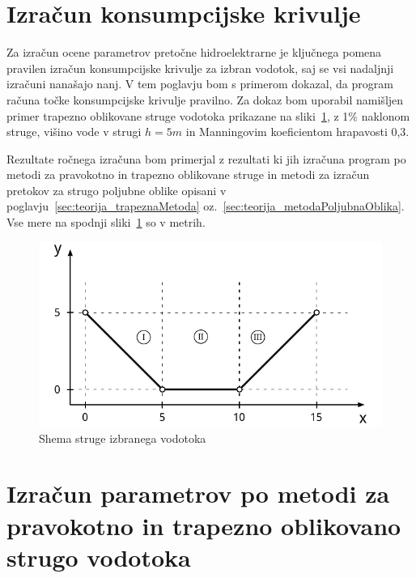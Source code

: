 \newpage

\section{Izračun konsumpcijske krivulje}\label{sec:izracun}

Za izračun ocene parametrov pretočne hidroelektrarne je ključnega pomena pravilen izračun konsumpcijske krivulje za izbran vodotok, saj se vsi nadaljnji izračuni nanašajo nanj. V tem poglavju bom s primerom dokazal, da program računa točke konsumpcijske krivulje pravilno. Za dokaz bom uporabil namišljen primer trapezno oblikovane struge vodotoka prikazane na sliki~\ref{fig:izracun_trapeznaStruga}, z 1\% naklonom struge, višino vode v strugi $h=5m$ in Manningovim koeficientom hrapavosti 0,3.

Rezultate ročnega izračuna bom primerjal z rezultati ki jih izračuna program po metodi za pravokotno in trapezno oblikovane struge in metodi za izračun pretokov za strugo poljubne oblike opisani v poglavju~\ref{sec:teorija_trapeznaMetoda}  oz.~\ref{sec:teorija_metodaPoljubnaOblika}. Vse mere na spodnji  sliki~\ref{fig:izracun_trapeznaStruga} so v metrih.



\begin{figure}[ht!]
	\begin{centering}
		\includegraphics{slike/izracuni/shema_trapezneStruge.pdf}		
		\caption{Shema struge izbranega vodotoka}\label{fig:izracun_trapeznaStruga}
	\end{centering}
\end{figure}




\section{Izračun parametrov po metodi za pravokotno in trapezno oblikovano strugo vodotoka}\label{sec:izracun_trapeznaMetoda}


